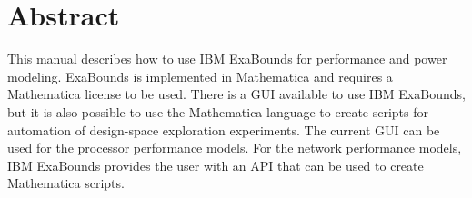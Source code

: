 \section*{Abstract}

This manual describes how to use IBM ExaBounds for performance and power modeling. ExaBounds is implemented in Mathematica and requires a Mathematica license to be used. There is a GUI available to use IBM ExaBounds, but it is also possible to use the Mathematica language to create scripts for automation of design-space exploration experiments. The current GUI can be used for the processor performance models. For the network performance models, IBM ExaBounds provides the user with an
API that can be used to create Mathematica scripts.
